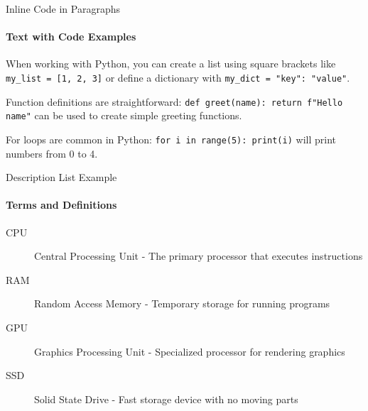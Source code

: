 \documentclass[10pt,aspectratio=169]{beamer}
\begin{document}
\begin{frame}{Inline Code in Paragraphs}
    \framesubtitle{Text with Code Examples}
    
    When working with Python, you can create a list using square brackets like 
    \texttt{my_list = [1, 2, 3]} or define a dictionary with 
    \texttt{my_dict = {"key": "value"}}.
    
    \medskip
    
    Function definitions are straightforward: \texttt{def greet(name): return f"Hello {name}"}
    can be used to create simple greeting functions.
    
    \medskip
    
    For loops are common in Python: \texttt{for i in range(5): print(i)} will print
    numbers from 0 to 4.
\end{frame}

\begin{frame}{Description List Example}
    \framesubtitle{Terms and Definitions}
    \begin{description}
        \item[CPU] Central Processing Unit - The primary processor that executes instructions
        \item[RAM] Random Access Memory - Temporary storage for running programs
        \item[GPU] Graphics Processing Unit - Specialized processor for rendering graphics
        \item[SSD] Solid State Drive - Fast storage device with no moving parts
    \end{description}
\end{frame}

\backmatter %
\end{document}

